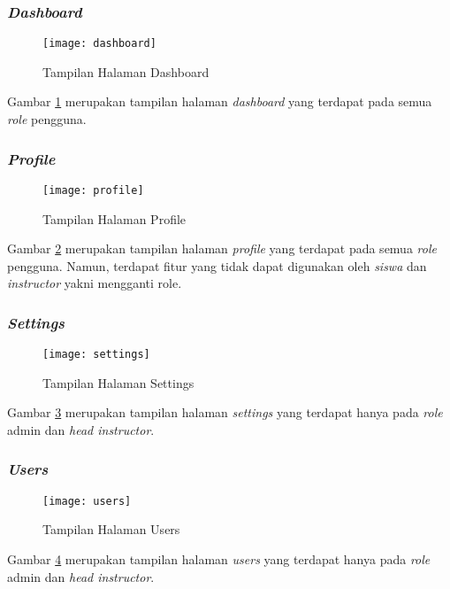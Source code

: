 \subsubsection{\textit{Dashboard}}
\begin{figure}[H]
	\centering  
	\texttt{[image: dashboard]}  
	\caption[Tampilan Halaman \textit{Dashboard}]{Tampilan Halaman Dashboard} 
	\label{fig:dashboard} 
\end{figure} 

Gambar \ref{fig:dashboard} merupakan tampilan halaman \textit{dashboard} yang terdapat pada semua \textit{role} pengguna.
\subsubsection{\textit{Profile}}
\begin{figure}[H]
	\centering  
	\texttt{[image: profile]}  
	\caption[Tampilan Halaman \textit{Profile}]{Tampilan Halaman Profile} 
	\label{fig:profile} 
\end{figure}

Gambar \ref{fig:profile} merupakan tampilan halaman \textit{profile} yang terdapat pada semua \textit{role} pengguna. Namun, terdapat fitur yang tidak dapat digunakan oleh \textit{siswa} dan \textit{instructor} yakni mengganti role.

\subsubsection{\textit{Settings}}
\begin{figure}[H]
	\centering  
	\texttt{[image: settings]}  
	\caption[Tampilan Halaman \textit{Settings}]{Tampilan Halaman Settings} 
	\label{fig:settings} 
\end{figure}

Gambar \ref{fig:settings} merupakan tampilan halaman \textit{settings} yang terdapat hanya pada \textit{role} admin dan \textit{head instructor}. 

\subsubsection{\textit{Users}}
\begin{figure}[H]
	\centering  
	\texttt{[image: users]}  
	\caption[Tampilan Halaman \textit{Users}]{Tampilan Halaman Users} 
	\label{fig:users} 
\end{figure}

Gambar \ref{fig:users} merupakan tampilan halaman \textit{users} yang terdapat hanya pada \textit{role} admin dan \textit{head instructor}.

